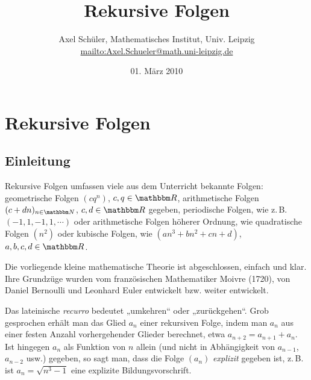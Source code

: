 \documentclass[11pt,a4paper]{article}
\title{Rekursive Folgen\kosemnetlicensemark}
\author{Axel Schüler, Mathematisches Institut, Univ. Leipzig\\[8pt]
\url{mailto:Axel.Schueler@math.uni-leipzig.de}}
\date{01. März 2010}
\begin{document}
\maketitle

\section{Rekursive Folgen}
\subsection{Einleitung}
\nocite{b-Markuschewitsch}

Rekursive Folgen umfassen viele aus dem Unterricht bekannte Folgen:
geometrische Folgen $(cq^n)$, $c,q\in \R$, arithmetische Folgen
$(c+dn)_{n\in\N}$, $c,d\in\R $ gegeben, periodische Folgen, wie z.\,B.{}
$(-1,1,-1,1,\cdots)$ oder arithmetische Folgen höherer Ordnung, wie
quadratische Folgen $(n^2)$ oder kubische Folgen, wie $(an^3 +bn^2 +cn+d)$,
$a,b,c,d\in \R $.

Die vorliegende kleine mathematische Theorie ist abgeschlossen, einfach und
klar.  Ihre Grundzüge wurden vom französischen Mathematiker {\sc Moivre}
(1720), von {\sc Daniel Bernoulli} und {\sc Leonhard Euler} entwickelt bzw.{}
weiter entwickelt.

Das lateinische \emph{recurro} bedeutet „umkehren“ oder „zurückgehen“. Grob
gesprochen erhält man das Glied $a_n$ einer rekursiven Folge, indem man $a_n$
aus einer festen Anzahl vorhergehender Glieder berechnet, etwa $a_{n+2}=a_{n+1}
+a_n$. Ist hingegen $a_n$ als Funktion von $n$ allein (und nicht in
Abhängigkeit von $a_{n-1}$, $a_{n-2}$ usw.{}) gegeben, so sagt man, dass die
Folge $(a_n)$ \emph{explizit} gegeben ist, z.\,B.{} ist $a_n=\sqrt{n^3 -1} $
eine explizite Bildungsvorschrift.
\end{document}
